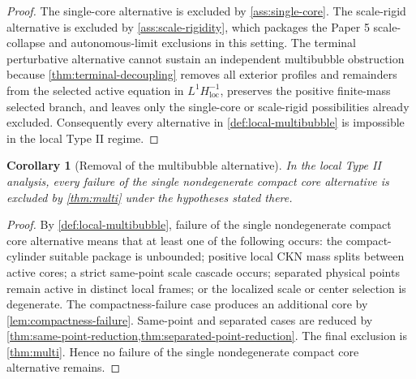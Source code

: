 \documentclass[11pt]{amsart}
\theoremstyle{plain}
\newtheorem{corollary}[theorem]{Corollary}
\theoremstyle{definition}
\theoremstyle{remark}
\begin{document}
\begin{proof}
The single-core alternative is excluded by \cref{ass:single-core}.  The
scale-rigid alternative is excluded by \cref{ass:scale-rigidity}, which packages
the Paper 5 scale-collapse and autonomous-limit exclusions in this setting.  The
terminal perturbative alternative cannot sustain an independent multibubble
obstruction because
\cref{thm:terminal-decoupling} removes all exterior profiles and remainders from
the selected active equation in \(L^1H^{-1}_{\mathrm{loc}}\), preserves the positive
finite-mass selected branch, and leaves only the single-core or scale-rigid
possibilities already excluded.  Consequently every alternative in
\cref{def:local-multibubble} is impossible in the local Type II regime.
\end{proof}

\begin{corollary}[Removal of the multibubble alternative]\label{cor:multi-removal}
In the local Type II analysis, every failure of the single nondegenerate compact
core alternative is excluded by \cref{thm:multi} under the hypotheses stated
there.
\end{corollary}

\begin{proof}
By \cref{def:local-multibubble}, failure of the single nondegenerate compact
core alternative means that at least one of the following occurs: the
compact-cylinder suitable package is unbounded; positive local CKN mass splits
between active cores; a strict same-point scale cascade occurs; separated
physical points remain active in distinct local frames; or the localized scale
or center selection is degenerate.  The compactness-failure case produces an
additional core by \cref{lem:compactness-failure}.  Same-point and separated
cases are reduced by \cref{thm:same-point-reduction,thm:separated-point-reduction}.
The final exclusion is \cref{thm:multi}.  Hence no failure of the single
nondegenerate compact core alternative remains.
\end{proof}



\end{document}
